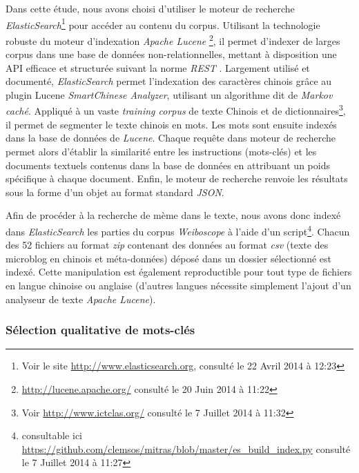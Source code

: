     Dans cette étude, nous avons choisi d'utiliser le moteur de recherche \textit{ElasticSearch}\footnote{Voir le site \url{http://www.elasticsearch.org}, consulté le 22 Avril 2014 à 12:23} pour accéder au contenu du corpus. Utilisant la technologie robuste du moteur d'indexation \textit{Apache Lucene}  \footnote{ \url{http://lucene.apache.org/} consulté le 20 Juin 2014 à 11:22}, il permet d'indexer de larges corpus dans une base de données non-relationnelles, mettant à disposition une API efficace et structurée suivant la norme \textit{REST} \citep{Masse2012}. Largement utilisé et documenté, \textit{ElasticSearch} permet l'indexation des caractères chinois grâce au plugin Lucene \textit{SmartChinese Analyzer}, utilisant un algorithme dit de \textit{Markov caché}. Appliqué à un vaste \textit{training corpus} de texte Chinois et de dictionnaires\footnote{Voir \url{http://www.ictclas.org/} consulté le 7 Juillet 2014 à 11:32}, il permet de segmenter le texte chinois en mots. Les mots sont ensuite indexés dans la base de données de \textit{Lucene}. Chaque requête dans \le moteur de recherche permet alors d'établir la similarité entre les instructions (mots-clés) et les documents textuels contenus dans la base de données en attribuant un poids spécifique à chaque document. Enfin, le moteur de recherche renvoie les résultats sous la forme d'un objet au format standard \textit{JSON}.

    Afin de procéder à la recherche de mème dans le texte, nous avons donc indexé dans \textit{ElasticSearch} les parties du corpus \textit{Weiboscope} à l'aide d'un script\footnote{consultable ici \url{https://github.com/clemsos/mitras/blob/master/es_build_index.py} consulté le 7 Juillet 2014 à 11:27}. Chacun des 52 fichiers au format \textit{zip} contenant des données au format \textit{csv} (texte des microblog en chinois et méta-données) déposé dans un dossier sélectionné est indexé. Cette manipulation est également reproductible pour tout type de fichiers en langue chinoise ou anglaise (d'autres langues nécessite simplement l'ajout d'un analyseur de texte \textit{Apache Lucene}).

\subsubsection[Sélection qualitative de mots-clés]{Sélection qualitative de mots-clés}

